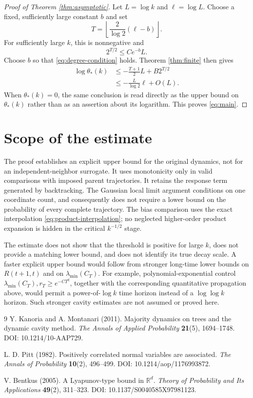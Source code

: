\documentclass[11pt]{article}
\theoremstyle{remark}\newtheorem{remark}[theorem]{Remark}
\begin{document}
\begin{proof}[Proof of Theorem \ref{thm:asymptotic}]
Let $L=\log k$ and $\ell=\log L$. Choose a fixed, sufficiently large
constant $b$ and set
\[
 T=\left\lfloor\frac2{\log2}(\ell-b)\right\rfloor.
\]
For sufficiently large $k$, this is nonnegative and
\[
 2^{T/2}\le C e^{-b}L.
\]
Choose $b$ so that \eqref{eq:degree-condition} holds. Theorem
\ref{thm:finite} then gives
\begin{align*}
 \log\theta_*(k)
 &\le-\frac{T+1}{2}L+B2^{T/2}\\
 &\le-\frac L{\log2}\ell+O(L).
\end{align*}
When $\theta_*(k)=0$, the same conclusion is read directly as the upper
bound on $\theta_*(k)$ rather than as an assertion about its logarithm.
This proves \eqref{eq:main}.
\end{proof}

\section{Scope of the estimate}
The proof establishes an explicit upper bound for the original dynamics,
not for an independent-neighbor surrogate. It uses monotonicity only in
valid comparisons with imposed parent trajectories. It retains the
response term generated by backtracking. The Gaussian local limit
argument conditions on one coordinate count, and consequently does not
require a lower bound on the probability of every complete trajectory.
The bias comparison uses the exact interpolation
\eqref{eq:product-interpolation}; no neglected higher-order product
expansion is hidden in the critical $k^{-1/2}$ stage.

The estimate does not show that the threshold is positive for large
$k$, does not provide a matching lower bound, and does not identify its
true decay scale. A faster explicit upper bound would follow from stronger
long-time lower bounds on $R(t+1,t)$ and on $\lambda_{\min}(C_T)$.
For example, polynomial-exponential control
$\lambda_{\min}(C_T),r_T\ge e^{-C T^q}$, together with the corresponding
quantitative propagation above, would permit a power-of-$\log k$ time
horizon instead of a $\log\log k$ horizon. Such stronger cavity estimates
are not assumed or proved here.

\begin{thebibliography}{9}
Y. Kanoria and A. Montanari (2011).
Majority dynamics on trees and the dynamic cavity method.
\emph{The Annals of Applied Probability} \textbf{21}(5), 1694--1748.
DOI: 10.1214/10-AAP729.

L. D. Pitt (1982).
Positively correlated normal variables are associated.
\emph{The Annals of Probability} \textbf{10}(2), 496--499.
DOI: 10.1214/aop/1176993872.

V. Bentkus (2005).
A Lyapunov-type bound in $\mathbb R^d$.
\emph{Theory of Probability and Its Applications} \textbf{49}(2), 311--323.
DOI: 10.1137/S0040585X97981123.
\end{thebibliography}
\end{document}
